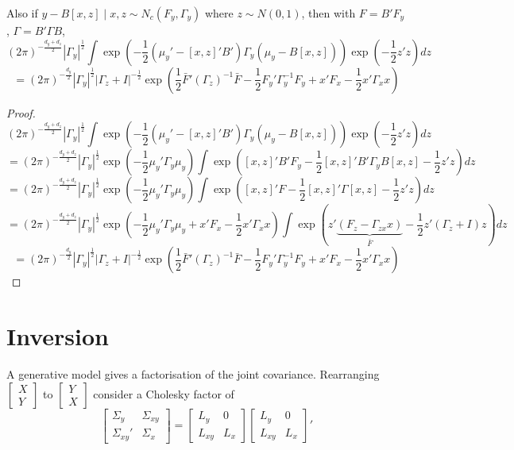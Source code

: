 \documentclass[11pt]{article}
\begin{document}
Also if $y - B[x,z] \mid x, z \sim N_c(F_y, \Gamma_y)$ where $z \sim N(0,1)$, then with $F = B'F_y$, $\Gamma = B'\Gamma B$,
\[
(2\pi)^{-\frac{d_y + d_z}2}|\Gamma_y|^{\frac12} \int \exp\left(-\frac12 (\mu_y' - [x  , z ]'B') \Gamma_y (\mu_y - B [x, z])\right) \exp\left(-\frac12 z'z\right) d z
\]
\[
=(2\pi)^{-\frac{d_y}2}|\Gamma_y|^{\frac12}|\Gamma_z +I|^{-\frac12} \exp\left(\frac12 \bar F'(\Gamma_z)^{-1} \bar F-\frac12 F_y' \Gamma_y^{-1} F_y + x'F_x -\frac12 x' \Gamma_x x \right)
\]
\begin{proof}
\[
(2\pi)^{-\frac{d_y + d_z}2}|\Gamma_y|^{\frac12} \int \exp\left(-\frac12 (\mu_y' - [x  , z ]'B') \Gamma_y (\mu_y - B [x, z])\right) \exp\left(-\frac12 z'z\right) d z
\]
\[
=(2\pi)^{-\frac{d_y+ d_z}2}|\Gamma_y|^{\frac12} \exp\left( -\frac12 \mu_y' \Gamma_y \mu_y \right) \int \exp\left([x,z]'B' F_y -\frac12[x  , z ]'B' \Gamma_y B [x, z]-\frac12 z'z\right) d z
\]
\[
=(2\pi)^{-\frac{d_y+ d_z}2}|\Gamma_y|^{\frac12} \exp\left( -\frac12 \mu_y' \Gamma_y \mu_y \right)\int \exp\left([x,z]' F -\frac12[x  , z ]' \Gamma [x, z]-\frac12 z'z\right) d z
\]
\[
=(2\pi)^{-\frac{d_y+ d_z}2}|\Gamma_y|^{\frac12} \exp\left(-\frac12 \mu_y' \Gamma_y \mu_y + x'F_x -\frac12 x' \Gamma_x x \right)\int \exp\left(z' \underbrace{(F_z -  \Gamma_{zx} x)}_{\bar F} -\frac12 z' (\Gamma_z + I) z \right) d z
\]
\[
=(2\pi)^{-\frac{d_y}2}|\Gamma_y|^{\frac12}|\Gamma_z +I|^{-\frac12} \exp\left(\frac12 \bar F'(\Gamma_z)^{-1} \bar F-\frac12 F_y' \Gamma_y^{-1} F_y + x'F_x -\frac12 x' \Gamma_x x \right)
\]
\end{proof}
\section{Inversion}


A generative model gives a factorisation of the joint covariance.
Rearranging $\begin{bmatrix}X\\Y\end{bmatrix}$ to $\begin{bmatrix}Y\\X\end{bmatrix}$ consider a Cholesky factor of  
\[
\begin{bmatrix}\Sigma_{y} & \Sigma_{xy} \\ \Sigma_{xy}' &\Sigma_{x} \end{bmatrix}
= \begin{bmatrix}L_{y} & 0 \\  L_{xy} &L_{x} \end{bmatrix} \begin{bmatrix}L_{y} & 0 \\  L_{xy} &L_{x} \end{bmatrix} '
\]
\end{document}
